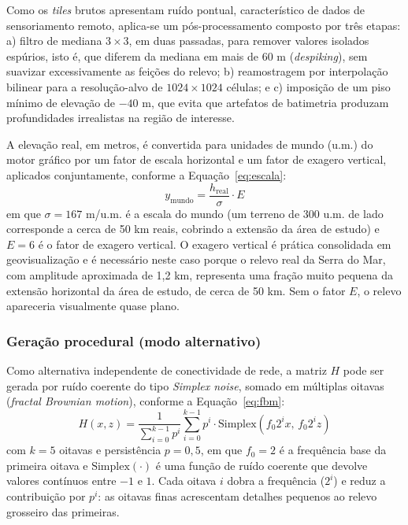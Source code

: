 \documentclass[conference]{IEEEtran}
\begin{document}
Como os \emph{tiles} brutos apresentam ruído pontual, característico de
dados de sensoriamento remoto, aplica-se um pós-processamento composto por
três etapas: a) filtro de mediana $3 \times 3$, em duas passadas, para
remover valores isolados espúrios, isto é, que diferem da mediana em mais de 60 m (\emph{despiking}), sem suavizar
excessivamente as feições do relevo; b) reamostragem por interpolação
bilinear para a resolução-alvo de $1024 \times 1024$ células; e c)
imposição de um piso mínimo de elevação de $-40$ m, que evita que
artefatos de batimetria produzam profundidades irrealistas na região de
interesse.

A elevação real, em metros, é convertida para unidades de mundo (u.m.) do
motor gráfico por um fator de escala horizontal e um fator de exagero
vertical, aplicados conjuntamente, conforme a Equação~\eqref{eq:escala}:
\begin{equation}
y_{\text{mundo}} = \frac{h_{\text{real}}}{\sigma} \cdot E
\label{eq:escala}
\end{equation}
em que $\sigma = 167$ m/u.m. é a escala do mundo (um terreno de 300 u.m. de
lado corresponde a cerca de 50 km reais, cobrindo a extensão da área de
estudo) e $E = 6$ é o fator de exagero vertical. O exagero vertical é prática
consolidada em geovisualização e é necessário neste caso porque o relevo
real da Serra do Mar, com amplitude aproximada de 1,2 km, representa uma
fração muito pequena da extensão horizontal da área de estudo, de cerca de
50 km. Sem o fator $E$, o relevo apareceria visualmente quase plano.

\subsubsection{Geração procedural (modo alternativo)}
Como alternativa independente de conectividade de rede, a matriz $H$ pode
ser gerada por ruído coerente do tipo \emph{Simplex noise}, somado em
múltiplas oitavas (\emph{fractal Brownian motion}), conforme a
Equação~\eqref{eq:fbm}:
\begin{equation}
H(x,z) = \frac{1}{\sum_{i=0}^{k-1} p^i} \sum_{i=0}^{k-1} p^i \cdot
\text{Simplex}(f_0 2^i x,\, f_0 2^i z)
\label{eq:fbm}
\end{equation}
com $k = 5$ oitavas e persistência $p = 0{,}5$, em que $f_0 = 2$ é a
frequência base da primeira oitava e $\text{Simplex}(\cdot)$ é uma função de
ruído coerente que devolve valores contínuos entre $-1$ e $1$. Cada oitava
$i$ dobra a frequência ($2^i$) e reduz a contribuição por $p^i$: as oitavas
finas acrescentam detalhes pequenos ao relevo grosseiro das primeiras.
\end{document}

